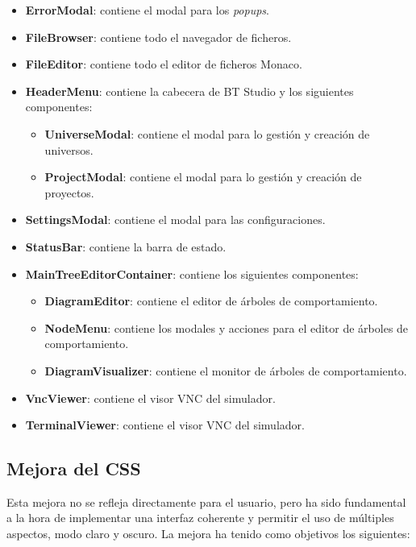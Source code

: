 \begin{itemize}
    \item \textbf{ErrorModal}: contiene el modal para los \textit{popups}.
    \item \textbf{FileBrowser}: contiene todo el navegador de ficheros.
    \item \textbf{FileEditor}: contiene todo el editor de ficheros Monaco.
    \item \textbf{HeaderMenu}: contiene la cabecera de BT Studio y los siguientes componentes:
    \begin{itemize}
        \item \textbf{UniverseModal}: contiene el modal para lo gestión y creación de universos.
        \item \textbf{ProjectModal}: contiene el modal para lo gestión y creación de proyectos.
    \end{itemize}
    \item \textbf{SettingsModal}: contiene el modal para las configuraciones.
    \item \textbf{StatusBar}: contiene la barra de estado.
    \item \textbf{MainTreeEditorContainer}: contiene los siguientes componentes:
    \begin{itemize}
        \item \textbf{DiagramEditor}: contiene el editor de árboles de comportamiento.
        \item \textbf{NodeMenu}: contiene los modales y acciones para el editor de árboles de comportamiento.
        \item \textbf{DiagramVisualizer}: contiene el monitor de árboles de comportamiento.
    \end{itemize}
    \item \textbf{VncViewer}: contiene el visor VNC del simulador.
    \item \textbf{TerminalViewer}: contiene el visor VNC del simulador.
\end{itemize}

\subsection{Mejora del CSS}

Esta mejora no se refleja directamente para el usuario, pero ha sido fundamental a la hora de implementar una interfaz coherente y permitir el uso de múltiples aspectos, modo claro y oscuro. La mejora ha tenido como objetivos los siguientes:


